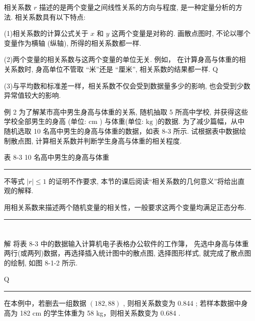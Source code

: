\documentclass[10pt]{article}
\newcommand{\HRule}{\begin{center}\rule{0.9\linewidth}{0.2mm}\end{center}}
\begin{document}
相关系数 \(r\) 描述的是两个变量之间线性关系的方向与程度, 是一种定量分析的方法. 相关系数具有以下特点:

(1)相关系数的计算公式关于 \(x\) 和 \(y\) 这两个变量是对称的. 画散点图时, 不论以哪个变量作为横轴 (纵轴), 所得的相关系数都一样.

(2)两个变量的相关系数与这两个变量的单位无关. 例如， 在计算身高与体重的相关系数时, 身高单位不管取 “米”还是 “厘米”, 相关系数的结果都一样. Q

(3)与平均数和标准差一样，相关系数不仅会受到数据量多少的影响, 也会受到少数异常值较大的影响.

例 2 为了解某市高中男生身高与体重的关系, 随机抽取 5 所高中学校, 并获得这些学校全部男生的身高 (单位: \(\mathrm{{cm}}\) ) 与体重(单位: \(\mathrm{{kg}}\) )的数据. 为了减少篇幅，从中随机选取 10 名高中男生的身高与体重的数据，如表 8-3 所示. 试根据表中数据绘制散点图, 计算相关系数并判断学生身高与体重的相关程度.

表 8-3 10 名高中男生的身高与体重

\begin{center}
\end{center}

\HRule

不等式 \(\left| r\right|  \leq  1\) 的证明不作要求, 本节的课后阅读“相关系数的几何意义”将给出直观的解释.

用相关系数来描述两个随机变量的相关性，一般要求这两个变量均满足正态分布.

\HRule

\section*{}

解 将表 8-3 中的数据输入计算机电子表格办公软件的工作簿， 先选中身高与体重两行(或两列)数据，再选择插入统计图中的散点图, 选择图形样式, 就完成了散点图的绘制, 如图 8-1-2 所示.

Q

\HRule

在本例中，若删去一组数据 \(\left( {{182},{88}}\right)\) , 则相关系数变为 0.844 ; 若样本数据中身高为 182 cm 的学生体重为 58 kg，则相关系数变为 0.684 .
\end{document}
